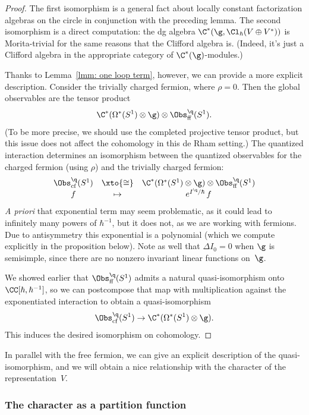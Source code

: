 \documentclass[10pt]{amsart}
\begin{document}
\begin{proof}
The first isomorphism is a general fact about locally constant factorization algebras on the circle in conjunction with the preceding lemma.
The second isomorphism is a direct computation: the dg algebra $\C^*(\g, \Cl_\hbar(V \oplus V^*))$ is Morita-trivial for the same reasons that the Clifford algebra is.
(Indeed, it's just a Clifford algebra in the appropriate category of $\C^*(\g)$-modules.)


Thanks to Lemma~\ref{lmm: one loop term}, however,
we can provide a more explicit description.
Consider the trivially charged fermion, where $\rho = 0$.
Then the global observables are the tensor product
\[
\C^*(\Omega^*(S^1) \otimes \g) \otimes \Obs^\q_{\rm ff}(S^1).
\]
(To be more precise, we should use the completed projective tensor product, 
but this issue does not affect the cohomology in this de Rham setting.)
The quantized interaction determines an isomorphism between the quantized observables for the charged fermion (using $\rho$) and the trivially charged fermion:
\[
\begin{array}{ccc}
\Obs^\q_{\rm cf}(S^1) & \xto{\cong} & \C^*(\Omega^*(S^1) \otimes \g) \otimes \Obs^\q_{\rm ff}(S^1) \\
f & \mapsto & e^{I^\q/\hbar} \,f 
\end{array}
\]
{\it A priori} that exponential term may seem problematic, as it could lead to infinitely many powers of $\hbar^{-1}$,
but it does not, as we are working with fermions.
Due to antisymmetry this exponential is a polynomial (which we compute explicitly in the proposition below).
Note as well that $\Delta I_0 = 0$ when $\g$ is semisimple, since there are no nonzero invariant linear functions on~$\g$.

We showed earlier that $\Obs^\q_{\rm ff}(S^1)$ admits a natural quasi-isomorphism onto $\CC[\hbar,\hbar^{-1}]$, 
so we can postcompose that map with multiplication against the exponentiated interaction to obtain a quasi-isomorphism
\[
\Obs^\q_{\rm cf}(S^1) \to \C^*(\Omega^*(S^1) \otimes \g).
\]
This induces the desired isomorphism on cohomology.
\end{proof}

In parallel with the free fermion, we can give an explicit description of the quasi-isomorphism,
and we will obtain a nice relationship with the character of the representation~$V$.

\subsubsection{The character as a partition function}
\end{document}
